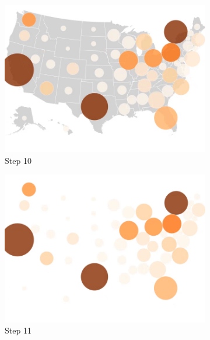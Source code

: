 \begin{figure}[!htb]
    \begin{subfigure}[b]{0.31\textwidth}
        \centering
        \includegraphics[width=\textwidth]{images/results/dot_cartogram/transition_10.png}
        \caption[]%
        {{\small Step 10}}
    \end{subfigure}
    \hfill
    \begin{subfigure}[b]{0.31\textwidth}
        \centering
        \includegraphics[width=\textwidth]{images/results/dot_cartogram/transition_11.png}
        \caption[]%
        {{\small Step 11}}
    \end{subfigure}
    \hfill
    \begin{subfigure}[b]{0.31\textwidth}
        \centering

\end{subfigure}
\end{figure}
